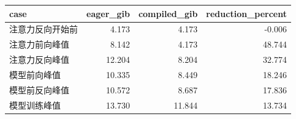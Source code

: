 \begin{tabular}{lrrr}
\toprule
case & eager\_gib & compiled\_gib & reduction\_percent \\
\midrule
注意力反向开始前 & 4.173 & 4.173 & -0.006 \\
注意力前向峰值 & 8.142 & 4.173 & 48.744 \\
注意力反向峰值 & 12.204 & 8.204 & 32.774 \\
模型前向峰值 & 10.335 & 8.449 & 18.246 \\
模型前反向峰值 & 10.572 & 8.687 & 17.836 \\
模型训练峰值 & 13.730 & 11.844 & 13.734 \\
\bottomrule
\end{tabular}
